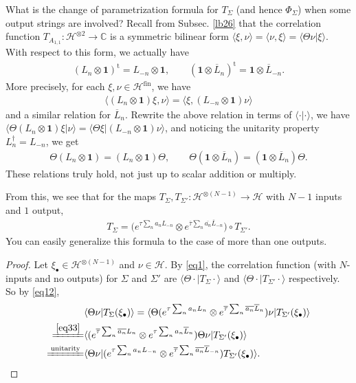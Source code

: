 \documentclass[12pt,a4paper,notitlepage]{article}
\theoremstyle{definition}
\theoremstyle{plain}
\newcommand{\mc}{\mathcal}
\newcommand{\ovl}{\overline}
\newcommand{\tr}{\mathrm{t}} %
\newcommand{\id}{\mathbf{1}}
\newcommand{\bk}[1]{\langle {#1}\rangle}
\newcommand{\blt}{\bullet}
\newcommand{\Cbb}{\mathbb C}
\newcommand{\fin}{\mathrm{fin}}
\numberwithin{equation}{section}
\begin{document}
What is the change of parametrization formula for $T_\Sigma$ (and hence $\Phi_\Sigma$) when some output strings are involved? Recall from Subsec. \ref{lb26} that the correlation function $T_{A_{1,1}}:\mc H^{\otimes 2}\rightarrow\Cbb$ is a symmetric bilinear form $\bk{\xi,\nu}=\bk{\nu,\xi}=\bk{\Theta\nu|\xi}$. With respect to this form, we actually have
\begin{align}
(L_n\otimes\id)^\tr=L_{-n}\otimes\id,\qquad (\id\otimes\ovl L_n)^\tr=\id\otimes \ovl L_{-n}.	\label{eq15}
\end{align}
More precisely, for each $\xi,\nu\in\mc H^\fin$, we have
\begin{align*}
\bk{(L_n\otimes\id)\xi,\nu}=\bk{\xi,(L_{-n}\otimes\id)\nu}	
\end{align*} 
and a similar relation for $\ovl L_n$. Rewrite the above relation in terms of $\bk{\cdot|\cdot}$, we have $\bk{\Theta(L_n\otimes\id)\xi|\nu}=\bk{\Theta\xi|(L_{-n}\otimes\id)\nu}	$, and noticing the unitarity property $L_n^\dagger=L_{-n}$, we get
\begin{align}
\Theta(L_n\otimes\id)=(L_n\otimes\id)\Theta,\qquad \Theta(\id\otimes\ovl L_n)=(\id\otimes\ovl L_n)\Theta.\label{eq33}
\end{align}
These relations truly hold, not just up to scalar addition or multiply.

From this, we see that for the maps $T_\Sigma,T_{\Sigma'}:\mc H^{\otimes(N-1)}\rightarrow\mc H$ with $N-1$ inputs and $1$ output,
\begin{align}
T_\Sigma=\Big(e^{\tau\sum_n a_nL_{-n}}\otimes e^{\ovl \tau\sum_n \ovl{a_n}\ovl L_{-n}}\Big)\circ T_{\Sigma'}.	\label{eq13}
\end{align}
You can easily generalize this formula to the case of more than one outputs.
\begin{proof}
Let $\xi_\blt\in\mc H^{\otimes(N-1)}$ and $\nu\in\mc H$. By \eqref{eq1}, the correlation function (with $N$-inputs and no outputs) for $\Sigma$ and $\Sigma'$ are $\bk{\Theta\cdot|T_\Sigma\cdot}$ and $\bk{\Theta\cdot|T_{\Sigma'}\cdot}$ respectively. So by  \eqref{eq12}, 
\begin{align*}
&\bk{\Theta\nu|T_\Sigma(\xi_\blt)}=\bk{\Theta (e^{\tau\sum_n a_nL_n}\otimes e^{\ovl \tau\sum_n \ovl{a_n}\ovl L_n})\nu|T_{\Sigma'}(\xi_\blt)}\\
\xlongequal{\eqref{eq33}}&	\bk{(e^{\ovl \tau\sum_n \ovl{a_n}L_n}\otimes e^{\tau\sum_n a_n\ovl L_n})\Theta \nu|T_{\Sigma'}(\xi_\blt)}\\
\xlongequal{\text{unitarity}}&\bk{\Theta \nu|(e^{\tau\sum_n a_nL_{-n}}\otimes e^{\ovl \tau\sum_n \ovl{a_n}\ovl L_{-n}})T_{\Sigma'}(\xi_\blt)}.
\end{align*}
\end{proof}
\end{document}
